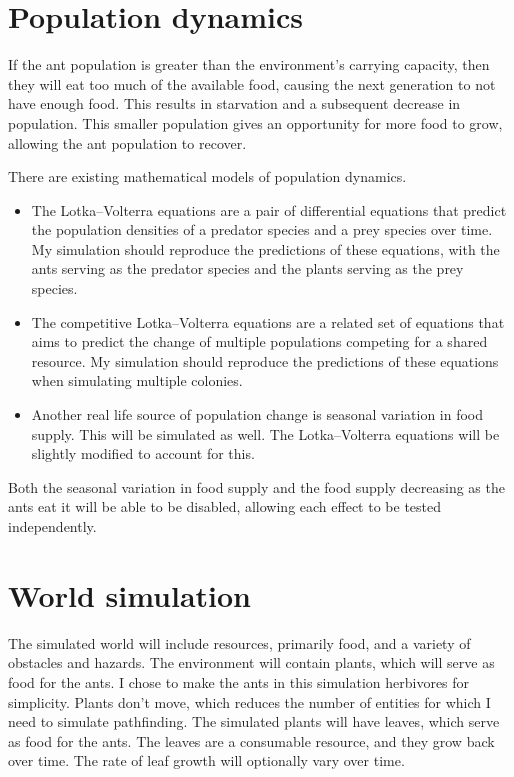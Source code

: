\documentclass[journal]{IEEEtran}
\begin{document}
\section{Population dynamics}

If the ant population is greater than the environment's carrying capacity, then they will eat too much of the available food, causing the next generation to not have enough food.
This results in starvation and a subsequent decrease in population.  This smaller population gives an opportunity for more food to grow, allowing the ant population to recover.

There are existing mathematical models of population dynamics.

\begin{itemize}

\item The Lotka–Volterra equations \cite{Lotka-Volterra-Equations:1} are a pair of differential equations that predict the population densities of a predator species and a prey species over time.  My simulation should reproduce the predictions of these equations, with the ants serving as the predator species and the plants serving as the prey species.

\item The competitive Lotka–Volterra equations are a related set of equations that aims to predict the change of multiple populations competing for a shared resource.  My simulation should reproduce the predictions of these equations when simulating multiple colonies.

\item Another real life source of population change is seasonal variation in food supply.  This will be simulated as well.  The Lotka–Volterra equations will be slightly modified to account for this.

\end{itemize}

Both the seasonal variation in food supply and the food supply decreasing as the ants eat it will be able to be disabled, allowing each effect to be tested independently.


\section{World simulation}

The simulated world will include resources, primarily food, and a variety of obstacles and hazards.  The environment will contain plants, which will serve as food for the ants.  I chose to make the ants in this simulation herbivores for simplicity.  
Plants don't move, which reduces the number of entities for which I need to simulate pathfinding.  The simulated plants will have leaves, which serve as food for the ants.
The leaves are a consumable resource, and they grow back over time.  The rate of leaf growth will optionally vary over time.
\end{document}
